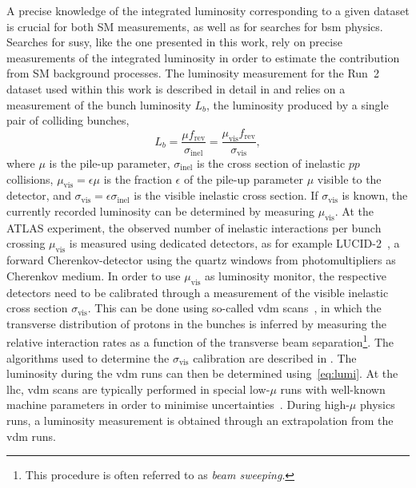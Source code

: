 A precise knowledge of the integrated luminosity corresponding to a given dataset is crucial for both SM measurements, as well as for searches for \gls{bsm} physics.
Searches for \gls{susy}, like the one presented in this work, rely on precise measurements of the integrated luminosity in order to estimate the contribution from SM background processes.
The luminosity measurement for the Run~2 dataset used within this work is described in detail in \cite{ATLAS-CONF-2019-021,Aaboud:2016hhf} and relies on a measurement of the bunch luminosity $L_b$, \ie the luminosity produced by a single pair of colliding bunches,
\begin{equation}
	L_b = \frac{\mu f_\mathrm{rev}}{	\sigma_\mathrm{inel}} = \frac{\mu_\mathrm{vis}f_\mathrm{rev}}{\sigma_\mathrm{vis}},
\end{equation}
where $\mu$ is the pile-up parameter, $\sigma_\mathrm{inel}$ is the cross section of inelastic $pp$ collisions, $\mu_\mathrm{vis} = \epsilon \mu$ is the fraction $\epsilon$ of the pile-up parameter $\mu$ visible to the detector, and $\sigma_\mathrm{vis} = \epsilon\sigma_\mathrm{inel}$ is the visible inelastic cross section.
If $\sigma_\mathrm{vis}$ is known, the currently recorded luminosity can be determined by measuring $\mu_\mathrm{vis}$.
At the ATLAS experiment, the observed number of inelastic interactions per bunch crossing $\mu_\mathrm{vis}$ is measured using dedicated detectors, as for example LUCID-2~\cite{Avoni_2018}, a forward Cherenkov-detector using the quartz windows from photomultipliers as Cherenkov medium.
In order to use $\mu_\mathrm{vis}$ as luminosity monitor, the respective detectors need to be calibrated through a measurement of the visible inelastic cross section $\sigma_\mathrm{vis}$.
This can be done using so-called \gls{vdm} scans~\cite{vanderMeer:296752,GRAFSTROM201597}, in which the transverse distribution of protons in the bunches is inferred by measuring the relative interaction rates as a function of the transverse beam separation\footnote{This procedure is often referred to as \textit{beam sweeping}.}.
The algorithms used to determine the $\sigma_\mathrm{vis}$ calibration are described in \cite{ATLAS-CONF-2019-021,Aaboud:2016hhf}.
The luminosity during the \gls{vdm} runs can then be determined using~\cref{eq:lumi}. At the \gls{lhc}, \gls{vdm} scans are typically performed in special low-$\mu$ runs with well-known machine parameters in order to minimise uncertainties~\cite{ATLAS-CONF-2019-021}.
During high-$\mu$ physics runs, a luminosity measurement is obtained through an extrapolation from the \gls{vdm} runs.

